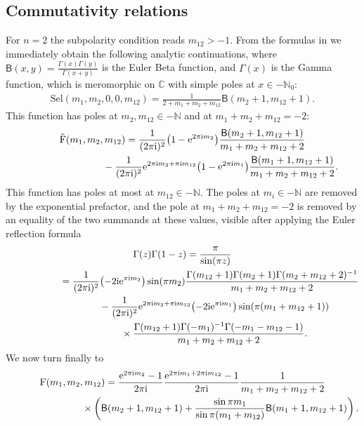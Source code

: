 \documentclass[pdftex]{sigma}%
\numberwithin{equation}{section}
\newcommand{\N}{\mathbb{N}}
\newcommand{\C}{\mathbb{C}}
\renewcommand{\i}{\mathrm{i}}
\newcommand{\Sel}{\mathrm{Sel}}
\newcommand{\Fp}{\mathrm{F}}
\newcommand{\rFp}{\tilde{\mathrm{F}}}
\begin{document}
\subsection{Commutativity relations}\label{sec_commutativity}
\newcommand{\Beta}{\mathsf{B}}
For $n=2$ the subpolarity condition reads $m_{12}>-1$. From the formulas in \cite[Example~5.21]{Len17} we immediately obtain the following analytic continuations, where $\Beta(x,y)=\frac{\Gamma(x)\Gamma(y)}{\Gamma(x+y)}$ is the Euler Beta function, and $\Gamma(x)$ is the Gamma function, which is meromorphic on $\C$ with simple poles at $x\in-\N_0$:
\begin{gather*}
\Sel(m_1,m_2,0,0,m_{12})
=\frac{1}{2+m_1+m_2+m_{12}} \Beta(m_2+1,m_{12}+1).
\end{gather*}
This function has poles at $m_2,m_{12}\in -\N$ and at $m_1+m_2+m_{12}=-2$:
\begin{gather*}
\rFp(m_1,m_2,m_{12})=\frac{1}{(2\pi\i)^2}\big(1-{\rm e}^{2\pi\i m_2}\big)
	 \frac{\Beta(m_2+1,m_{12}+1)}{m_1+m_2+m_{12}+2}\\
\hphantom{\rFp(m_1,m_2,m_{12})=}{}
-\frac{1}{(2\pi\i)^2}{\rm e}^{2\pi\i m_2+\pi\i m_{12}}\big(1-{\rm e}^{2\pi\i m_1}\big)
	 \frac{\Beta(m_1+1,m_{12}+1)}{m_1+m_2+m_{12}+2}.
\end{gather*}
This function has poles at most at $m_{12}\in -\N$. The poles at $m_i\in-\N$ are removed by the exponential prefactor, and the pole at $m_1+m_2+m_{12}=-2$ is removed by an equality of the two summands at these values, visible after applying the Euler reflection formula
\begin{gather*}
\Gamma(z)\Gamma(1-z)=\frac{\pi}{\sin(\pi z)}\\
\hphantom{\Gamma(z)\Gamma(1-z)}{}
=\frac{1}{(2\pi\i)^2}\big({-}2\i {\rm e}^{\pi\i m_2}\big)\sin(\pi m_2) \frac{\Gamma(m_{12}+1)\Gamma(m_2+1)\Gamma(m_2+m_{12}+2)^{-1}}{m_1+m_2+m_{12}+2}\\
\hphantom{\Gamma(z)\Gamma(1-z)=}{}
-\frac{1}{(2\pi\i)^2}{\rm e}^{2\pi\i m_2+\pi\i m_{12}}\big({-}2\i {\rm e}^{\pi\i m_1}\big)\sin(\pi (m_1+m_{12}+1))\\
\hphantom{\Gamma(z)\Gamma(1-z)=}{}
\times\frac{\Gamma(m_{12}+1)\Gamma(-m_1)^{-1}\Gamma(-m_1-m_{12}-1)}{m_1+m_2+m_{12}+2}.
\end{gather*}
We now turn finally to
\begin{gather*}
\Fp(m_1,m_2,m_{12}) =\frac{{\rm e}^{2\pi\i m_2}-1}{2\pi\i}\frac{{\rm e}^{2\pi\i m_1+2\pi\i m_{12}}-1}{2\pi\i}
	 \frac{1}{m_1+m_2+m_{12}+2} \\
\hphantom{\Fp(m_1,m_2,m_{12}) =}{}
 \times \left(\Beta(m_2+1,m_{12}+1)+\frac{\sin\pi m_1}{\sin\pi(m_1+m_{12})}\Beta(m_1+1,m_{12}+1)\right).
\end{gather*}
\end{document}
